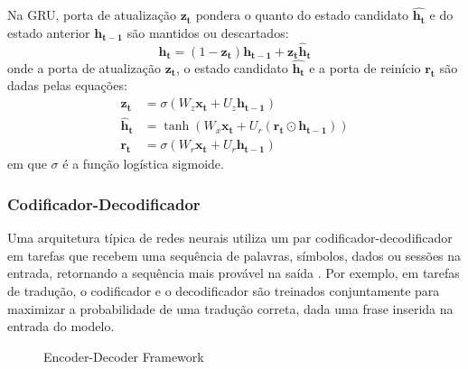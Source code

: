 Na GRU, porta de atualização $\mathbf{z_t}$ pondera o quanto do
estado candidato $\mathbf{\hat{h_t}}$ e do estado anterior $\mathbf{h_{t-1}}$
são mantidos ou descartados:
\begin{equation}
    \mathbf{h_t} = (1 - \mathbf{z_t})\mathbf{h_{t-1}} + \mathbf{z_t}\mathbf{\hat{h}_t}
\end{equation}
onde a porta de atualização $\mathbf{z_t}$, o estado candidato $\mathbf{\hat{h_t}}$
e a porta de reinício $\mathbf{r_t}$ são dadas pelas equações:
\begin{align}
    \mathbf{z_t} &= \sigma(W_z\mathbf{x_t} + U_z\mathbf{h_{t-1}}) \\
    \mathbf{\hat{h}_t} &= \tanh(W_x\mathbf{x_t} + U_r(\mathbf{r_t} \odot \mathbf{h_{t-1}})) \\
    \mathbf{r_t} &= \sigma(W_r\mathbf{x_t} + U_r\mathbf{h_{t-1}})
\end{align}
em que $\sigma$ é a função logística sigmoide.

\subsubsection{Codificador-Decodificador}
Uma arquitetura típica de redes neurais utiliza um par codificador-decodificador
em tarefas que recebem uma sequência de palavras, símbolos, dados ou sessões na
entrada, retornando a sequência mais provável na saída
\cite{bahdanau2016neural}. Por exemplo, em tarefas de tradução, o codificador e
o decodificador são treinados conjuntamente para maximizar a probabilidade de
uma tradução correta, dada uma frase inserida na entrada do modelo.

\vspace{1cm}
\begin{figure}[htbp]
    \centering
      \caption{Encoder-Decoder Framework}

\end{figure}

